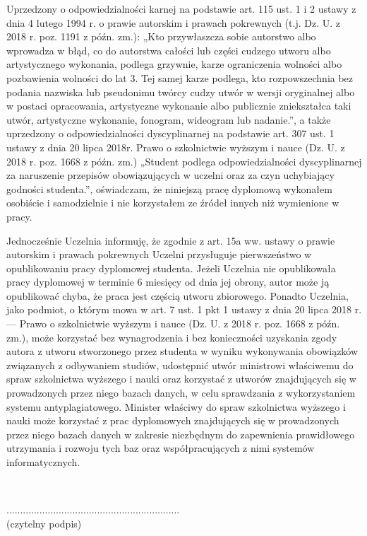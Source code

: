 \documentclass[10pt,a4paper]{article}
\begin{document}
Uprzedzony o odpowiedzialności karnej na podstawie art. 115 ust. 1 i 2 ustawy z dnia
4 lutego 1994 r. o prawie autorskim i prawach pokrewnych (t.j. Dz. U. z 2018 r. poz. 1191 z
późn. zm.): „Kto przywłaszcza sobie autorstwo albo wprowadza w błąd, co do autorstwa całości
lub części cudzego utworu albo artystycznego wykonania, podlega grzywnie, karze
ograniczenia wolności albo pozbawienia wolności do lat 3. Tej samej karze podlega, kto
rozpowszechnia bez podania nazwiska lub pseudonimu twórcy cudzy utwór w wersji
oryginalnej albo w postaci opracowania, artystyczne wykonanie albo publicznie zniekształca
taki utwór, artystyczne wykonanie, fonogram, wideogram lub nadanie.”, a także uprzedzony o
odpowiedzialności dyscyplinarnej na podstawie art. 307 ust. 1 ustawy z dnia 20 lipca 2018r.
Prawo o szkolnictwie wyższym i nauce (Dz. U. z 2018 r. poz. 1668 z późn. zm.) „Student
podlega odpowiedzialności dyscyplinarnej za naruszenie przepisów obowiązujących w uczelni
oraz za czyn uchybiający godności studenta.”, oświadczam, że niniejszą pracę dyplomową
wykonałem osobiście i samodzielnie i nie korzystałem ze źródeł innych niż wymienione w
pracy. 

Jednocześnie Uczelnia informuję, że zgodnie z art. 15a ww. ustawy o prawie autorskim
i prawach pokrewnych Uczelni przysługuje pierwszeństwo w opublikowaniu pracy
dyplomowej studenta. Jeżeli Uczelnia nie opublikowała pracy dyplomowej w terminie 6
miesięcy od dnia jej obrony, autor może ją opublikować chyba, że praca jest częścią utworu
zbiorowego. Ponadto Uczelnia, jako podmiot, o którym mowa w art. 7 ust. 1 pkt 1 ustawy z
dnia 20 lipca 2018 r. — Prawo o szkolnictwie wyższym i nauce (Dz. U. z 2018 r. poz. 1668 z
późn. zm.), może korzystać bez wynagrodzenia i bez konieczności uzyskania zgody autora z
utworu stworzonego przez studenta w wyniku wykonywania obowiązków związanych z
odbywaniem studiów, udostępnić utwór ministrowi właściwemu do spraw szkolnictwa
wyższego i nauki oraz korzystać z utworów znajdujących się w prowadzonych przez niego
bazach danych, w celu sprawdzania z wykorzystaniem systemu antyplagiatowego. Minister
właściwy do spraw szkolnictwa wyższego i nauki może korzystać z prac dyplomowych
znajdujących się w prowadzonych przez niego bazach danych w zakresie niezbędnym do
zapewnienia prawidłowego utrzymania i rozwoju tych baz oraz współpracujących z nimi
systemów informatycznych.

\vfill
\
\begin{flushright}
	............................................................... \\
	(czytelny podpis)
\end{flushright}
\end{document}
